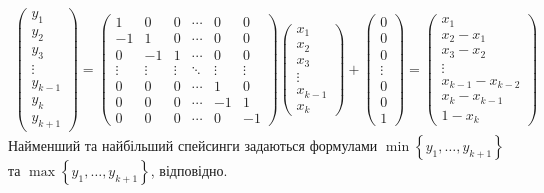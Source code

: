 \begin{gather*}
    \begin{pmatrix}
        y_1 \\ y_2 \\ y_3 \\ \vdots \\ y_{k-1} \\ y_k \\ y_{k+1}
    \end{pmatrix} = 
    \begin{pmatrix}
        1  & 0  & 0 & \cdots & 0 & 0 \\
        -1 & 1  & 0 & \cdots & 0 & 0 \\
        0  & -1 & 1 & \cdots & 0 & 0 \\
        \vdots & \vdots & \vdots & \ddots& \vdots& \vdots \\
        0  & 0  & 0 & \cdots & 1 & 0 \\
        0  & 0  & 0 & \cdots & -1 & 1 \\
        0  & 0  & 0 & \cdots & 0 & -1
    \end{pmatrix}
    \begin{pmatrix}
        x_1 \\ x_2 \\ x_3 \\ \vdots \\ x_{k-1} \\ x_k
    \end{pmatrix} + 
    \begin{pmatrix}
        0\\ 0 \\ 0 \\ \vdots \\ 0 \\ 0 \\ 1
    \end{pmatrix} = 
    \begin{pmatrix}
        x_1 \\ x_2 - x_1 \\ x_3 - x_2 \\ \vdots \\ x_{k-1} - x_{k-2} \\ x_k - x_{k-1} \\ 1 - x_{k}
    \end{pmatrix}
\end{gather*}
Найменший та найбільший спейсинги
задаються формулами
$\min\left\{y_1,\dots,y_{k+1} \right\}$ та
$\max\left\{y_1,\dots,y_{k+1} \right\}$, відповідно.

